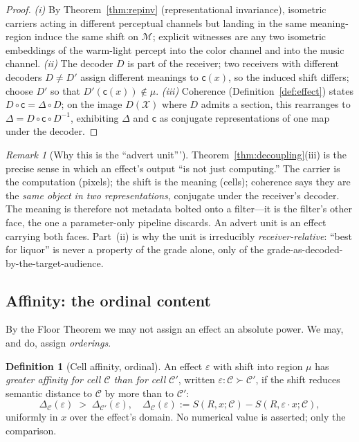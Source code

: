 \documentclass[twocolumn,11pt,a4paper]{article}
\theoremstyle{adv}
\theoremstyle{definition}
\newtheorem{definition}[theorem]{Definition}
\theoremstyle{remark}
\newtheorem{remark}[theorem]{Remark}
\newcommand{\Out}{\mathcal{X}}         %
\newcommand{\Cell}{\mathcal{C}}        %
\newcommand{\Dec}{D}                   %
\newcommand{\Recv}{R}                  %
\newcommand{\Sval}{S}                  %
\newcommand{\Eff}{\varepsilon}        %
\newcommand{\Carrier}{\kappa}         %
\renewcommand{\Carrier}{\mathsf{c}}
\newcommand{\Mean}{\mathcal{M}}        %
\newcommand{\shift}{\Delta}            %
\begin{document}
\begin{proof}
\emph{(i)} By Theorem~\ref{thm:repinv} (representational invariance),
isometric carriers acting in different perceptual channels but landing in
the same meaning-region induce the same shift on $\Mean$; explicit
witnesses are any two isometric embeddings of the warm-light percept into
the color channel and into the music channel. \emph{(ii)} The decoder
$\Dec$ is part of the receiver; two receivers with different decoders
$\Dec\ne\Dec'$ assign different meanings to $\Carrier(x)$, so the induced
shift differs; choose $\Dec'$ so that $\Dec'(\Carrier(x))\notin\mu$.
\emph{(iii)} Coherence (Definition~\ref{def:effect}) states
$\Dec\circ\Carrier=\shift\circ\Dec$; on the image $\Dec(\Out)$ where
$\Dec$ admits a section, this rearranges to
$\shift=\Dec\circ\Carrier\circ\Dec^{-1}$, exhibiting $\shift$ and
$\Carrier$ as conjugate representations of one map under the decoder.
\end{proof}

\begin{remark}[Why this is the ``advert unit''']
\label{rem:advertunit}
Theorem~\ref{thm:decoupling}(iii) is the precise sense in which an effect's
output ``is not just computing.'' The carrier is the computation (pixels);
the shift is the meaning (cells); coherence says they are the \emph{same
object in two representations}, conjugate under the receiver's decoder. The
meaning is therefore not metadata bolted onto a filter---it is the filter's
other face, the one a parameter-only pipeline discards. An advert unit is an
effect carrying both faces. Part~(ii) is why the unit is irreducibly
\emph{receiver-relative}: ``best for liquor'' is never a property of the
grade alone, only of the grade-as-decoded-by-the-target-audience.
\end{remark}

\subsection{Affinity: the ordinal content}

By the Floor Theorem we may not assign an effect an absolute power. We may,
and do, assign \emph{orderings}.

\begin{definition}[Cell affinity, ordinal]
\label{def:affinity}
An effect $\Eff$ with shift into region $\mu$ has \emph{greater affinity
for cell $\Cell$ than for cell $\Cell'$}, written
$\Eff:\Cell\succ\Cell'$, if the shift reduces semantic distance to $\Cell$
by more than to $\Cell'$:
\[
  \Delta_\Cell(\Eff) \;>\; \Delta_{\Cell'}(\Eff),\quad
  \Delta_\Cell(\Eff):=\Sval(\Recv,x;\Cell)-\Sval(\Recv,\Eff\!\cdot x;\Cell),
\]
uniformly in $x$ over the effect's domain. No numerical value is asserted;
only the comparison.
\end{definition}
\end{document}
